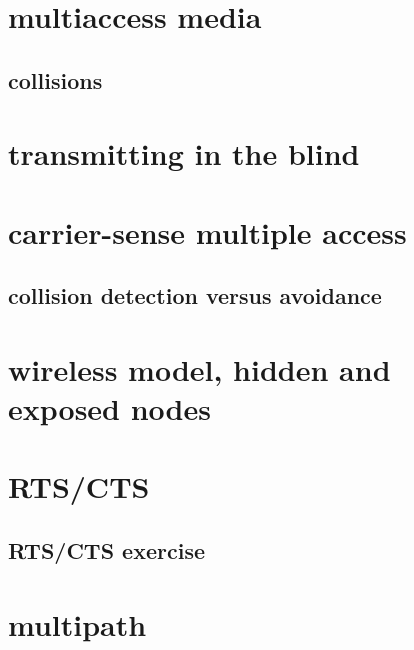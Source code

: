 \section{multiaccess media}



\subsection{collisions}


\section{transmitting in the blind}


\section{carrier-sense multiple access}


\subsection{collision detection versus avoidance}


\section{wireless model, hidden and exposed nodes} 


\section{RTS/CTS}


\subsection{RTS/CTS exercise}


\section{multipath}


